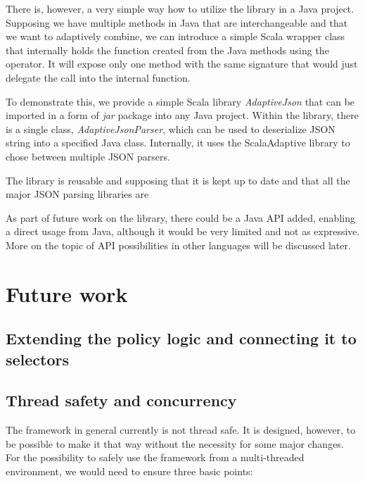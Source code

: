 There is, however, a very simple way how to utilize the library in a Java project. Supposing we have multiple methods in Java that are interchangeable and that we want to adaptively combine, we can introduce a simple Scala wrapper class that internally holds the function created from the Java methods using the  operator. It will expose only one method with the same signature that would just delegate the call into the internal function.

To demonstrate this, we provide a simple Scala library \textit{AdaptiveJson} that can be imported in a form of \textit{jar} package into any Java project. Within the library, there is a single class, \textit{AdaptiveJsonParser}, which can be used to deserialize JSON string into a specified Java class. Internally, it uses the ScalaAdaptive library to chose between multiple JSON parsers.

The library is reusable and supposing that it is kept up to date and that all the major JSON parsing libraries are 


As part of future work on the library, there could be a Java API added, enabling a direct usage from Java, although it would be very limited and not as expressive. More on the topic of API possibilities in other languages will be discussed later.



\section{Future work}

\subsection{Extending the policy logic and connecting it to selectors}

\subsection{Thread safety and concurrency}

The framework in general currently is not thread safe. It is designed, however, to be possible to make it that way without the necessity for some major changes. For the possibility to safely use the framework from a multi-threaded environment, we would need to ensure three basic points:

